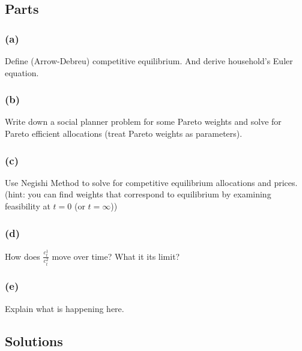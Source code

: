 \documentclass[10pt, a4paper]{article}
\begin{document}
  \subsection*{Parts}
    \subsubsection*{(a)}
      Define (Arrow-Debreu) competitive equilibrium. And derive household's Euler equation.
    \subsubsection*{(b)}
      Write down a social planner problem for some Pareto weights and solve for Pareto efficient allocations (treat Pareto weights as parameters).
    \subsubsection*{(c)}
      Use Negishi Method to solve for competitive equilibrium allocations and prices. (hint: you can find weights that correspond to equilibrium by examining feasibility at $t = 0$ (or $t = \infty$))
    \subsubsection*{(d)}
      How does $\frac{c^1_t}{c^2_t}$ move over time? What it its limit?
    \subsubsection*{(e)}
      Explain what is happening here.
  \subsection*{Solutions}
\end{document}
